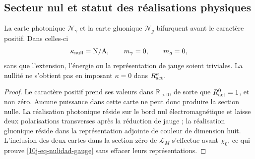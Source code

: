 \subsection{Secteur nul et statut des réalisations physiques}

\begin{theorem}
\label{10j-thm-sector-nulo}
La carte photonique \(\mathcal N_\gamma\) et la carte gluonique \(\mathcal N_g\) bifurquent avant le caractère positif. Dans celles-ci
\begin{equation}
 \kappa_{\rm null}=\mathrm{N/A},
 \qquad m_\gamma=0,
 \qquad m_g=0,
 \label{10j-eq-nulidad-gauge}
\end{equation}
sans que l'extension, l'énergie ou la représentation de jauge soient triviales. La nullité ne s'obtient pas en imposant \(\kappa=0\) dans \(R_{\rm act}^\kappa\).
\end{theorem}

\begin{proof}
Le caractère positif prend ses valeurs dans \(\mathbb R_{>0}\), de sorte que \(R_{\rm act}^0=1\), et non zéro. Aucune puissance dans cette carte ne peut donc produire la section nulle. La réalisation photonique réside sur le bord nul électromagnétique et laisse deux polarisations transverses après la réduction de jauge ; la réalisation gluonique réside dans la représentation adjointe de couleur de dimension huit. L'inclusion des deux cartes dans la section zéro de \(\mathcal L_M\) s'effectue avant \(\chi_0\), ce qui prouve \eqref{10j-eq-nulidad-gauge} sans effacer leurs représentations.
\end{proof}

